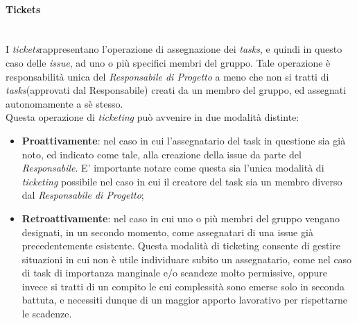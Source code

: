 \paragraph{Tickets} ~\\
	I \textit{tickets}\glossario rappresentano l'operazione di assegnazione dei \textit{tasks}\glossario, e quindi in questo caso delle \textit{issue}\glossario, ad uno o più specifici membri del gruppo. Tale operazione è responsabilità unica del \textit{Responsabile di Progetto} a meno che non si tratti di \textit{tasks}\glossario (approvati dal Responsabile) creati da un membro del gruppo, ed assegnati autonomamente a sè stesso.\\
	Questa operazione di \textit{ticketing} può avvenire in due modalità distinte:
	\begin{itemize}
	\item \textbf{Proattivamente}: nel caso in cui l'assegnatario del task in questione sia già noto, ed indicato come tale, alla creazione della issue da parte del \textit{Responsabile}. E' importante notare come questa sia l'unica modalità di \textit{ticketing} possibile nel caso in cui il creatore del task sia un membro diverso dal \textit{Responsabile di Progetto};
	\item \textbf{Retroattivamente}: nel caso in cui uno o più membri del gruppo vengano designati, in un secondo momento, come assegnatari di una issue già precedentemente esistente. Questa modalità di ticketing consente di gestire situazioni in cui non è utile individuare subito un assegnatario, come nel caso di task di importanza manginale e/o scandeze molto permissive, oppure invece si tratti di un compito le cui complessità sono emerse solo in seconda battuta, e necessiti dunque di un maggior apporto lavorativo per rispettarne le scadenze.
	\end{itemize}
